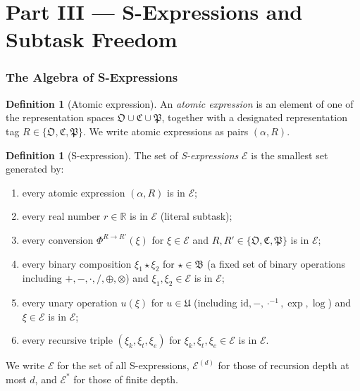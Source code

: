 \documentclass[twocolumn,11pt,a4paper]{article}
\theoremstyle{thmstyle}
\theoremstyle{thmstyle}
\theoremstyle{definition}
\newtheorem{definition}[theorem]{Definition}
\theoremstyle{remark}
\newcommand{\Real}{\mathbb{R}}
\newcommand{\Osc}{\mathfrak{O}}
\newcommand{\Cat}{\mathfrak{C}}
\newcommand{\Part}{\mathfrak{P}}
\newcommand{\Expr}{\mathcal{E}}
\newcommand{\Cat}{\mathfrak{C}}
\begin{document}
\part*{Part III --- S-Expressions and Subtask Freedom}

\section{The Algebra of S-Expressions}
\label{sec:s-expressions}

\begin{definition}[Atomic expression]\label{def:atomic}
An \emph{atomic expression} is an element of one of the
representation spaces $\Osc \cup \Cat \cup \Part$,
together with a designated representation tag
$R \in \{\mathfrak{O}, \mathfrak{C}, \mathfrak{P}\}$.
We write atomic expressions as pairs $(\alpha, R)$.
\end{definition}

\begin{definition}[S-expression]\label{def:s-expression}
The set of \emph{S-expressions} $\Expr$ is the smallest
set generated by:
\begin{enumerate}[nosep,label=(\arabic*)]
\item every atomic expression $(\alpha, R)$ is in $\Expr$;
\item every real number $r \in \Real$ is in $\Expr$
      (literal subtask);
\item every conversion $\Phi^{R \to R'}(\xi)$ for $\xi
      \in \Expr$ and $R, R' \in \{\mathfrak{O},
      \mathfrak{C}, \mathfrak{P}\}$ is in $\Expr$;
\item every binary composition $\xi_{1} \star \xi_{2}$
      for $\star \in \mathfrak{B}$ (a fixed set of
      binary operations including $+, -, \cdot, /,
      \oplus, \otimes$) and $\xi_{1}, \xi_{2} \in
      \Expr$ is in $\Expr$;
\item every unary operation $u(\xi)$ for $u \in
      \mathfrak{U}$ (including
      $\mathrm{id}, -, \cdot^{-1}, \exp, \log$) and
      $\xi \in \Expr$ is in $\Expr$;
\item every recursive triple $(\xi_{k}, \xi_{t},
      \xi_{e})$ for $\xi_{k}, \xi_{t}, \xi_{e} \in
      \Expr$ is in $\Expr$.
\end{enumerate}
We write $\Expr$ for the set of all S-expressions,
$\Expr^{(d)}$ for those of recursion depth at most $d$,
and $\Expr^{*}$ for those of finite depth.
\end{definition}
\end{document}
